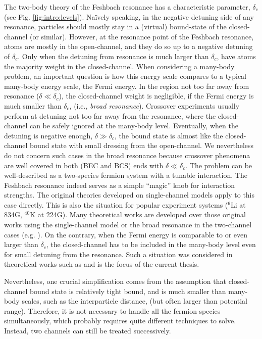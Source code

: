   The two-body theory of the Feshbach resonance has a characteristic  parameter, $\delta_c$ (see Fig. \ref{fig:intro:levels}).  Na\"{i}vely speaking, in the negative detuning side of any resonance, particles should mostly stay  in a (virtual) bound-state of the closed-channel (or similar).  However, at the resonance point  of the Feshbach resonance, atoms are mostly in the open-channel, and they do so up to a negative detuning of $\delta_c$. Only when the detuning from resonance is much larger than $\delta_c$, have atoms the majority weight in the closed-channel.    When considering a many-body problem, an important question is how this energy scale compares to a typical many-body energy scale, the Fermi energy. In the region not too far away from resonance ($\delta\ll\delta_{c}$), the closed-channel weight is negligible, if the Fermi energy is much smaller than $\delta_c$, (i.e., \emph{broad resonance}).  Crossover experiments usually perform at detuning not too far away from the resonance, where the closed-channel can be safely ignored at the many-body level. Eventually, when the detuning is negative enough, $\delta\gg\delta_{c}$, the bound state is almost like the closed-channel bound state with small dressing from the open-channel.  We nevertheless do not concern such cases in the broad resonance because crossover phenomena are well covered in both (BEC and BCS) ends with $\delta\ll\delta_{c}$. The problem can be well-described as a two-species fermion system with a tunable interaction.  The Feshbach resonance indeed serves as a simple ``magic'' knob for interaction strengths.  The original  theories developed on  single-channel models  apply to this case directly.  This is also the situation for  popular experiment systems (${}^{6}\text{Li}$ at 834G, $^{40}\text{K}$ at 224G).   Many theoretical works are developed over those original works using the single-channel model or the broad resonance   in  the two-channel cases (e.g. \cite{Holland01,HoUniversal,Fuchs04}). On the contrary, when the Fermi energy is  comparable to or even larger than $\delta_c$, the closed-channel has to be included in the many-body level even for small detuning from the resonance. Such a situation was considered in  theoretical works such as \cite{GurarieNarrow} and is the focus of the current thesis. 
  
  Nevertheless, one crucial simplification comes from  the assumption that closed-channel bound state is relatively tight bound, and is much smaller than  many-body scales, such as the interparticle distance, (but often larger than potential range).  Therefore, it is not necessary to handle all the  fermion species simultaneously, which probably requires quite different techniques to solve. Instead, two channels can still be treated successively. 

